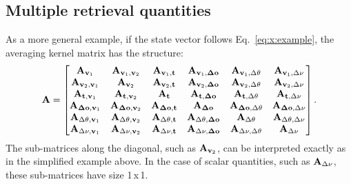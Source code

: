\subsection*{Multiple retrieval quantities}
%
As a more general example, if the state vector follows Eq.~\ref{eq:x:example},
the averaging kernel matrix has the structure:
\begin{equation}
  \label{eq:A:example}
  \mathbf{A} =
  \begin{bmatrix}
    \mathbf{A}_{\mathbf{v}_1} & \mathbf{A}_{\mathbf{v}_1,\mathbf{v}_2} &
    \mathbf{A}_{\mathbf{v}_1,\mathbf{t}} & \mathbf{A}_{\mathbf{v}_1,\mathbf{\Delta\mathbf{o}}} &
    \mathbf{A}_{\mathbf{v}_1,\Delta\theta} & \mathbf{A}_{\mathbf{v}_1,\Delta\nu} \\ 
    \mathbf{A}_{\mathbf{v}_2,\mathbf{v}_1} & \mathbf{A}_{\mathbf{v}_2} &
    \mathbf{A}_{\mathbf{v}_2,\mathbf{t}} & \mathbf{A}_{\mathbf{v}_2,\mathbf{\Delta\mathbf{o}}} &
    \mathbf{A}_{\mathbf{v}_2,\Delta\theta} & \mathbf{A}_{\mathbf{v}_2,\Delta\nu} \\ 
    \mathbf{A}_{\mathbf{t},\mathbf{v}_1} & \mathbf{A}_{\mathbf{t},\mathbf{v}_2} &
    \mathbf{A}_{\mathbf{t}} & \mathbf{A}_{\mathbf{t},\mathbf{\Delta\mathbf{o}}} &
    \mathbf{A}_{\mathbf{t},\Delta\theta} & \mathbf{A}_{\mathbf{t},\Delta\nu} \\ 
    \mathbf{A}_{\mathbf{\Delta\mathbf{o}},\mathbf{v}_1} & 
    \mathbf{A}_{\mathbf{\Delta\mathbf{o}},\mathbf{v}_2} &
    \mathbf{A}_{\mathbf{\Delta\mathbf{o}},\mathbf{t}} & \mathbf{A}_{\mathbf{\Delta\mathbf{o}}} &
    \mathbf{A}_{\mathbf{\Delta\mathbf{o}},\Delta\theta} &
    \mathbf{A}_{\mathbf{\Delta\mathbf{o}},\Delta\nu} \\ 
    \mathbf{A}_{\Delta\theta,\mathbf{v}_1} & \mathbf{A}_{\Delta\theta,\mathbf{v}_2} &
    \mathbf{A}_{\Delta\theta,\mathbf{t}} & \mathbf{A}_{\Delta\theta,\mathbf{\Delta\mathbf{o}}} &
    \mathbf{A}_{\Delta\theta} & \mathbf{A}_{\Delta\theta,\Delta\nu} \\ 
    \mathbf{A}_{\Delta\nu,\mathbf{v}_1} & \mathbf{A}_{\Delta\nu,\mathbf{v}_2} &
    \mathbf{A}_{\Delta\nu,\mathbf{t}} & \mathbf{A}_{\Delta\nu,\mathbf{\Delta\mathbf{o}}} &
    \mathbf{A}_{\Delta\nu,\Delta\theta} & \mathbf{A}_{\Delta\nu}
  \end{bmatrix}.
\end{equation}
The sub-matrices along the diagonal, such as $\mathbf{A}_{\mathbf{v}_2}$, can
be interpreted exactly as in the simplified example above. In the case of scalar
quantities, such as $\mathbf{A}_{\Delta\nu}$, these sub-matrices have size 1\,x\,1.

